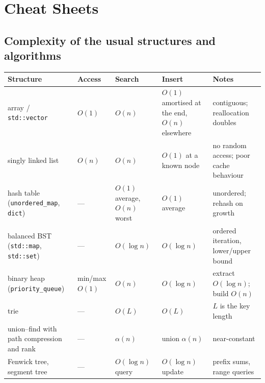 \documentclass[10pt,a4paper,openany,oneside]{report}
\begin{document}
\chapter{Cheat Sheets}
\label{app:cheat}

\section{Complexity of the usual structures and algorithms}
\begin{center}\small
\begin{xltabular}{\textwidth}{@{}L{4.0cm}L{2.2cm}L{2.5cm}L{2.5cm}Y@{}}
\toprule
\textbf{Structure} & \textbf{Access} & \textbf{Search} & \textbf{Insert} & \textbf{Notes}\\
\midrule\endhead
array / \texttt{std::vector} & $O(1)$ & $O(n)$ & $O(1)$ amortised at the end, $O(n)$ elsewhere & contiguous; reallocation doubles\\
singly linked list & $O(n)$ & $O(n)$ & $O(1)$ at a known node & no random access; poor cache behaviour\\
hash table (\texttt{unordered\_map}, \texttt{dict}) & --- & $O(1)$ average, $O(n)$ worst & $O(1)$ average & unordered; rehash on growth\\
balanced BST (\texttt{std::map}, \texttt{std::set}) & --- & $O(\log n)$ & $O(\log n)$ & ordered iteration, lower/upper bound\\
binary heap (\texttt{priority\_queue}) & min/max $O(1)$ & $O(n)$ & $O(\log n)$ & extract $O(\log n)$; build $O(n)$\\
trie & --- & $O(L)$ & $O(L)$ & $L$ is the key length\\
union--find with path compression and rank & --- & $\alpha(n)$ & union $\alpha(n)$ & near-constant\\
Fenwick tree, segment tree & --- & $O(\log n)$ query & $O(\log n)$ update & prefix sums, range queries\\
\bottomrule
\end{xltabular}
\end{center}
\end{document}
